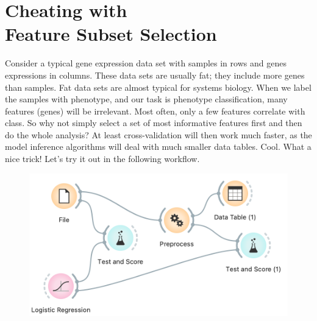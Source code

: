 \chapter{Cheating with \\ Feature Subset Selection}
\label{ch:fss-overfitting}

%
Consider a typical gene expression data set with samples in rows and genes expressions in columns. These data sets are usually fat; they include more genes than samples. Fat data sets are almost typical for systems biology. When we label the samples with phenotype, and our task is phenotype classification, many features (genes) will be irrelevant. Most often, only a few features correlate with class. So why not simply select a set of most informative features first and then do the whole analysis? At least cross-validation will then work much faster, as the model inference algorithms will deal with much smaller data tables. Cool. What a nice trick! Let’s try it out in the following workflow.

\begin{figure}[h]
    \centering
    \includegraphics[scale=0.5]{fss-overfitting-workflow.png}
    \caption{$\;$}
\end{figure}



